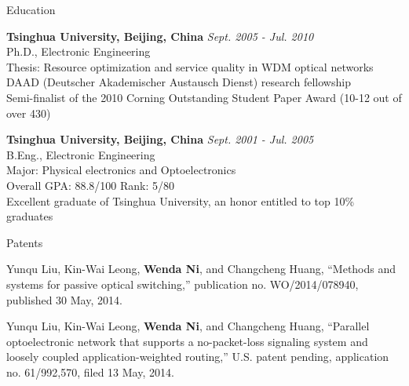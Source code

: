 \documentclass{resume} %
\begin{document}

\begin{rSection}{Education}

{\bf Tsinghua University, Beijing, China} \hfill {\em Sept. 2005 - Jul. 2010} \\ 
Ph.D., Electronic Engineering \\
Thesis: Resource optimization and service quality in WDM optical networks \\
DAAD (Deutscher Akademischer Austausch Dienst) research fellowship \\
Semi-finalist of the 2010 Corning Outstanding Student Paper Award (10-12 out of over 430)

{\bf Tsinghua University, Beijing, China} \hfill {\em Sept. 2001 - Jul. 2005} \\ 
B.Eng., Electronic Engineering \\
Major: Physical electronics and Optoelectronics \\
Overall GPA: 88.8/100 Rank: 5/80 \\
Excellent graduate of Tsinghua University, an honor entitled to top 10\% graduates

\end{rSection}



\begin{rSection}{Patents}

Yunqu Liu, Kin-Wai Leong, \textbf{Wenda Ni}, and Changcheng Huang, ``Methods and systems for passive optical switching,'' publication no. WO/2014/078940, published 30 May, 2014.

Yunqu Liu, Kin-Wai Leong, \textbf{Wenda Ni}, and Changcheng Huang, ``Parallel optoelectronic network that supports a no-packet-loss signaling system and loosely coupled application-weighted routing,'' U.S. patent pending, application no. 61/992,570, filed 13 May, 2014.
\end{rSection}



%
%
%
\end{document}
